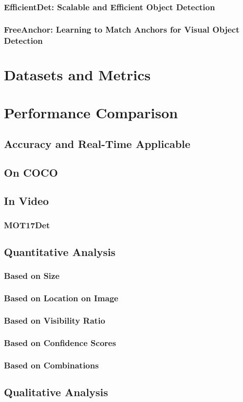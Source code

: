\documentclass[12pt, letterpaper, twoside]{article}
\begin{document}
\subsubsection{EfficientDet: Scalable and Efficient Object Detection}
\subsubsection{FreeAnchor: Learning to Match Anchors for Visual Object Detection}

\section{Datasets and Metrics}
\section{Performance Comparison}
\subsection{Accuracy and Real-Time Applicable}
\subsection{On COCO}

\subsection{In Video}
\subsubsection{MOT17Det}

\subsection{Quantitative Analysis}
\subsubsection{Based on Size}
\subsubsection{Based on Location on Image}
\subsubsection{Based on Visibility Ratio}
\subsubsection{Based on Confidence Scores}
\subsubsection{Based on Combinations}

\subsection{Qualitative Analysis}
\end{document}
